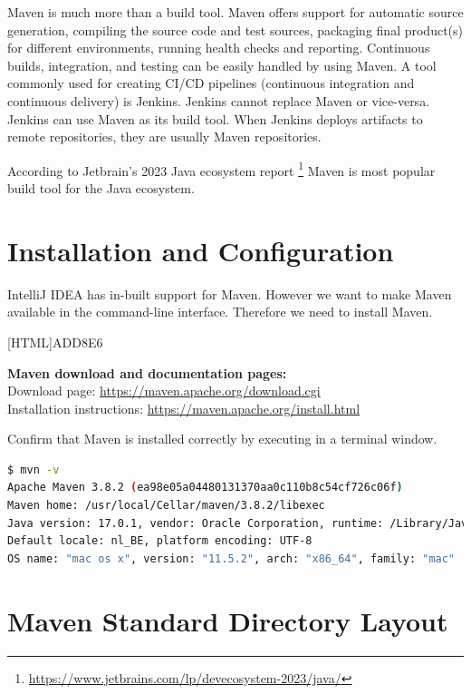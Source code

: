 Maven is much more than a build tool.  Maven offers support for automatic source generation,  compiling the source code and test sources, packaging final product(s) for different environments, running health checks and reporting.  Continuous builds, integration, and testing can be easily handled by using Maven. A tool commonly used for creating CI/CD pipelines (continuous integration and continuous delivery) is Jenkins.  Jenkins cannot replace Maven or vice-versa. Jenkins can use Maven as its build tool.  
When Jenkins deploys artifacts to remote repositories, they are usually Maven repositories. 

According to Jetbrain's 2023 Java ecosystem report \footnote{\url{https://www.jetbrains.com/lp/devecosystem-2023/java/}} Maven is most popular build tool for the Java ecosystem.

\section{Installation and Configuration}

IntelliJ IDEA has in-built support for Maven.  However we want to make Maven available in the command-line interface. Therefore we need to install Maven. 

 [HTML]{ADD8E6}{\parbox{\textwidth}{%
\noindent \textbf{Maven download and documentation pages:}\\
Download page: \url{https://maven.apache.org/download.cgi}\\
Installation instructions: \url{https://maven.apache.org/install.html}
}}

Confirm that Maven is installed correctly by executing  in a terminal window. 

\begin{lstlisting}[language=bash, frame=single]
$ mvn -v
Apache Maven 3.8.2 (ea98e05a04480131370aa0c110b8c54cf726c06f)
Maven home: /usr/local/Cellar/maven/3.8.2/libexec
Java version: 17.0.1, vendor: Oracle Corporation, runtime: /Library/Java/JavaVirtualMachines/jdk-17.0.1.jdk/Contents/Home
Default locale: nl_BE, platform encoding: UTF-8
OS name: "mac os x", version: "11.5.2", arch: "x86_64", family: "mac"
\end{lstlisting}


\section{Maven Standard Directory Layout}

